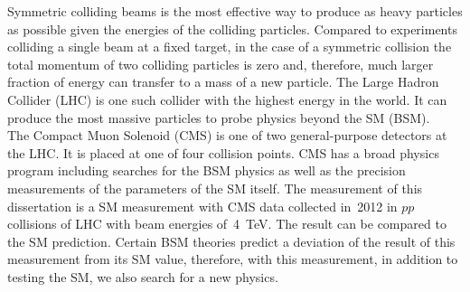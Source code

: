 Symmetric colliding beams is the most effective way to produce as heavy particles as possible given the energies of the colliding particles. Compared to experiments colliding a single beam at a fixed target, in the case of a symmetric collision the total momentum of two colliding particles is zero and, therefore, much larger fraction of energy can transfer to a mass of a new particle.  The Large Hadron Collider (LHC) is one such collider with the highest energy in the world. It can produce the most massive particles to probe physics beyond the SM (BSM). \\

The Compact Muon Solenoid (CMS) is one of two general-purpose detectors at the LHC. It is placed at one of four collision points. CMS has a broad physics program including searches for the BSM physics as well as the precision measurements of the parameters of the SM itself. The measurement of this dissertation is a SM measurement with CMS data collected in~2012 in $pp$ collisions of LHC with beam energies of~4~TeV. The result can be compared to the SM prediction. Certain BSM theories predict a deviation of the result of this measurement from its SM value, therefore, with this measurement, in addition to testing the SM, we also search for a new physics.\\



